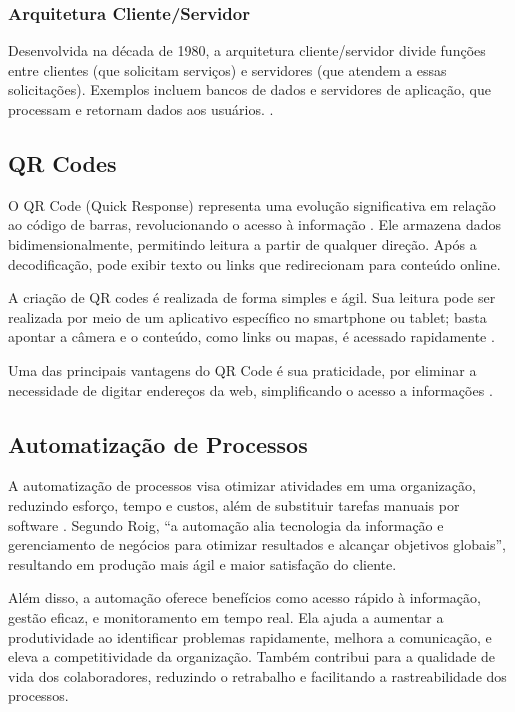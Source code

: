 \subsubsection{Arquitetura Cliente/Servidor}
Desenvolvida na década de 1980, a arquitetura cliente/servidor divide funções entre clientes (que solicitam serviços) e servidores (que atendem a essas solicitações). Exemplos incluem bancos de dados e servidores de aplicação, que processam e retornam dados aos usuários. \cite{ferreira2023}.

\subsection{QR Codes}
O QR Code (Quick Response) representa uma evolução significativa em relação ao código de barras, revolucionando o acesso à informação \cite{okada2011}. Ele armazena dados bidimensionalmente, permitindo leitura a partir de qualquer direção. Após a decodificação, pode exibir texto ou links que redirecionam para conteúdo online.

A criação de QR codes é realizada de forma simples e ágil. Sua leitura pode ser realizada por meio de um aplicativo específico no smartphone ou tablet; basta apontar a câmera e o conteúdo, como links ou mapas, é acessado rapidamente \cite{bernardo2011}.

Uma das principais vantagens do QR Code é sua praticidade, por eliminar a necessidade de digitar endereços da web, simplificando o acesso a informações \cite{goncalves2014}.

\subsection{Automatização de Processos}
A automatização de processos visa otimizar atividades em uma organização, reduzindo esforço, tempo e custos, além de substituir tarefas manuais por software \cite{roig2017}. Segundo Roig, ``a automação alia tecnologia da informação e gerenciamento de negócios para otimizar resultados e alcançar objetivos globais'', resultando em produção mais ágil e maior satisfação do cliente.

Além disso, a automação oferece benefícios como acesso rápido à informação, gestão eficaz, e monitoramento em tempo real. Ela ajuda a aumentar a produtividade ao identificar problemas rapidamente, melhora a comunicação, e eleva a competitividade da organização. Também contribui para a qualidade de vida dos colaboradores, reduzindo o retrabalho e facilitando a rastreabilidade dos processos.


